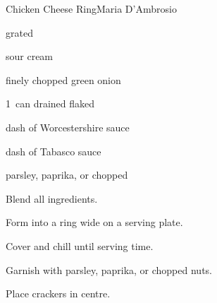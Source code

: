 \begin{recipe}{Chicken Cheese Ring}{Maria D'Ambrosio}{}

\begin{ingredients}
\item {} 
\item {} grated 
\item \C{\quarter} sour cream
\item \C{\quarter} finely chopped green onion
\item 1~can drained flaked 
\item dash of Worcestershire sauce
\item dash of Tabasco sauce
\item parsley, paprika, or chopped 
\end{ingredients}

\begin{directions}
\item Blend all ingredients.
\item Form into a ring  wide on a serving plate.
\item Cover and chill until serving time.
\item Garnish with parsley, paprika, or chopped nuts.
\item Place crackers in centre.
\end{directions}

\end{recipe}
